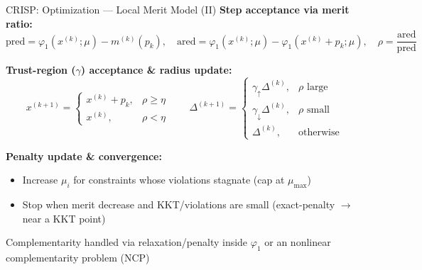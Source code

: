 \documentclass[10pt, aspectratio=169]{beamer}
\begin{document}
\begin{frame}{CRISP: Optimization — Local Merit Model (II)}
  \small
  \textbf{Step acceptance via merit ratio:}
  \[
    \text{pred}=\varphi_1(x^{(k)};\mu)-m^{(k)}(p_k), \quad
    \text{ared}=\varphi_1(x^{(k)};\mu)-\varphi_1(x^{(k)}\!+\!p_k;\mu), \quad
    \rho=\frac{\text{ared}}{\text{pred}}
  \]

  \textbf{Trust-region ($\gamma$) acceptance \& radius update:}
  \[
    x^{(k+1)}=
    \begin{cases}
      x^{(k)}+p_k, & \rho\ge \eta\\
      x^{(k)}, & \rho<\eta
    \end{cases}
    \qquad
    \Delta^{(k+1)}=
    \begin{cases}
      \gamma_{\uparrow}\Delta^{(k)}, & \rho\text{ large}\\
      \gamma_{\downarrow}\Delta^{(k)}, & \rho\text{ small}\\
      \Delta^{(k)}, & \text{otherwise}
    \end{cases}
  \]
  
  \textbf{Penalty update \& convergence:}
  \begin{itemize}\setlength{\itemsep}{0.2em}
    \item Increase $\mu_i$ for constraints whose violations stagnate (cap at $\mu_{\max}$)
    \item Stop when merit decrease and KKT/violations are small (exact-penalty $\rightarrow$ near a KKT point)
  \end{itemize}
  
  {\footnotesize Complementarity handled via relaxation/penalty inside $\varphi_1$ or an nonlinear complementarity problem (NCP)}
\end{frame}

\end{document}
